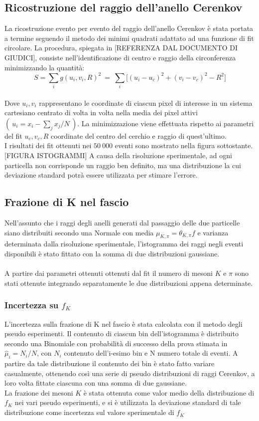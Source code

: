 \documentclass[8pt]{extarticle}
\begin{document}
\subsection{Ricostruzione del raggio dell'anello Cerenkov}
La ricostruzione evento per evento del raggio dell'anello Cerenkov è stata portata a termine seguendo il metodo dei minimi quadrati adattato ad una funzione di fit circolare. La procedura, spiegata in [REFERENZA DAL DOCUMENTO DI GIUDICI], consiste nell'identificazione di centro e raggio della circonferenza minimizzando la quantità:
\begin{equation}
S=\sum_i g(u_i, v_i, R)^2 \ = \ \sum_i \Big[ (u_i-u_c)^2+(v_i-v_c)^2 - R^2 \Big]
\end{equation}
\\
Dove $u_i, v_i$ rappresentano le coordinate di ciascun pixel di interesse in un sistema cartesiano centrato di volta in volta nella media dei pixel attivi $( \ u_i=x_i-\sum_j x_j /N\ )$. La minimizzazione viene effettuata rispetto ai parametri del fit $u_c, v_c, R$ coordinate del centro del cerchio e raggio di quest'ultimo.\\
I risultati dei fit ottenuti nei $50\ 000$ eventi sono mostrato nella figura sottostante. [FIGURA ISTOGRAMMI]
A causa della risoluzione sperimentale, ad ogni particella non corrisponde un raggio ben definito, ma una distribuzione la cui deviazione standard potrà essere utilizzata per stimare l'errore.

\subsection{Frazione di K nel fascio}
Nell'assunto che i raggi degli anelli generati dal passaggio delle due particelle siano distribuiti secondo una Normale con media $\mu_{K,\pi}=\theta_{K,\pi}f$ e varianza determinata dalla risoluzione sperimentale, l'istogramma dei raggi negli eventi disponibili è stato fittato con la somma di due distribuzioni gaussiane.\\
\\
A partire dai parametri ottenuti ottenuti dal fit il numero di mesoni $K$ e $\pi$ sono stati ottenute integrando separatamente le due distribuzioni appena determinate.\\
\subsubsection{Incertezza su $f_K$}
L'incertezza sulla frazione di K nel fascio è stata calcolata con il metodo degli pseudo esperimenti. Il contenuto di ciascun bin dell'istogramma è distribuito secondo una Binomiale con probabilità di successo della prova stimata in $\hat{\mu}_i = N_{i}/N$, con $N_i$ contenuto dell'i-esimo bin e N numero totale di eventi. A partire da tale distribuzione il contenuto dei bin è stato fatto variare casualmente, ottenendo così una serie di pseudo distribuzioni di raggi Cerenkov, a loro volta fittate ciascuna con una somma di due gaussiane.\\
La frazione dei mesoni $K$ è stata ottenuta come valor medio della distribuzione di $f_K$ nei vari pseudo esperimenti, e si è utilizzata la deviazione standard di tale distribuzione come incertezza sul valore sperimentale di $f_K$
\end{document}
